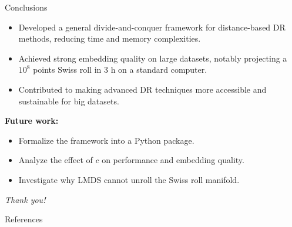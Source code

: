 \documentclass[10pt]{beamer}
\begin{document}
\begin{frame}{Conclusions}
\justifying
    \begin{itemize}
        \item Developed a general \alert{divide-and-conquer framework} for distance-based DR methods, reducing time and memory complexities.
        \item Achieved \alert{strong embedding quality} on large datasets, notably projecting a $10^8$ points Swiss roll in 3 h on a standard computer.
        \item Contributed to making advanced DR techniques more \alert{accessible and sustainable} for big datasets.
    \end{itemize}

\textbf{Future work:}
    \begin{itemize}
        \item Formalize the framework into a \alert{Python package}.
        \item Analyze the effect of \alert{$c$} on performance and embedding quality.
        \item Investigate why \alert{LMDS cannot unroll the Swiss roll} manifold.
    \end{itemize}

\vfill
\pause
\centering\emph{Thank you!}
\end{frame}

\begin{frame}[allowframebreaks]{References}
\printbibliography[heading=none]
\end{frame}
\end{document}
